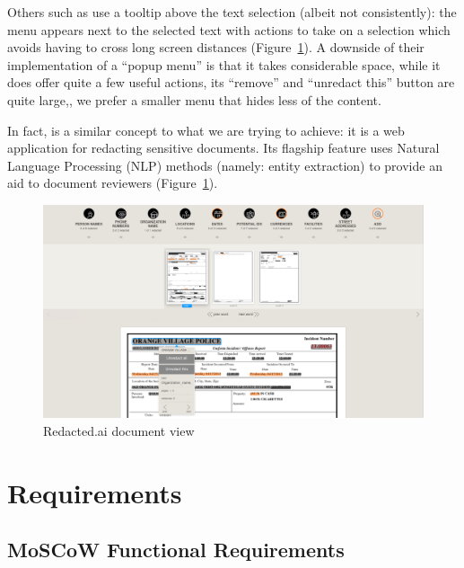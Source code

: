\documentclass[\version]{l4proj}
\begin{document}
Others such as \textcite{RedactedAIRemovea} use a tooltip above the text selection (albeit not consistently): the menu appears next to the selected text with actions to take on a selection which avoids having to cross long screen distances (Figure~\ref{fig:redactedai}).
A downside of their implementation of a ``popup menu'' is that it takes considerable space, while it does offer quite a few useful actions, its ``remove'' and ``unredact this'' button are quite large,, we prefer a smaller menu that hides less of the content.

In fact, \textcite{RedactedAIRemovea} is a similar concept to what we are trying to achieve: it is a web application for redacting sensitive documents. Its flagship feature uses Natural Language Processing (NLP) methods (namely: entity extraction) to provide an aid to document reviewers (Figure~\ref{fig:redactedai}).

\begin{figure}[H]
    \centering
    \includegraphics[width=0.95\linewidth]{images/related_products/redactedai.png}
    \caption{Redacted.ai document view}\label{fig:redactedai}
\end{figure}

\chapter{Requirements}

\section{MoSCoW Functional Requirements}
\end{document}
